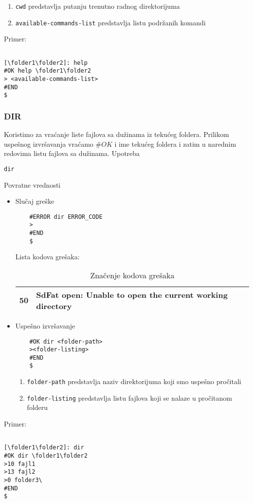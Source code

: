 \documentclass[a4paper]{extarticle}
\begin{document}
\begin{enumerate}
	\item \verb|cwd| predstavlja putanju trenutno radnog direktorijuma
	\item \verb|available-commands-list| predstavlja listu podržanih komandi
\end{enumerate}


Primer:
\begin{verbatim}

[\folder1\folder2]: help
#OK help \folder1\folder2
> <available-commands-list>
#END
$
\end{verbatim}

\subsubsection{DIR}
Koristimo za vraćanje liste fajlova sa dužinama iz tekućeg foldera.
Prilikom uspešnog izvršavanja vraćamo $\#OK$ i ime tekućeg foldera i zatim u narednim redovima listu fajlova sa dužinama.
Upotreba
\begin{verbatim}
dir
\end{verbatim}
Povratne vrednosti
\begin{itemize}
	\item Slučaj greške\\
	\begin{small}
	\begin{verbatim}
	#ERROR dir ERROR_CODE
	>
	#END
	$
	\end{verbatim}
\end{small}
	Lista kodova grešaka:
	\begin{table}[h]
		\centering
		\begin{tabular}{|l|l|}
			\hline
			50 & SdFat open: Unable to open the current working directory \\ \hline
		\end{tabular}
		\caption{Značenje kodova grešaka}
		\label{tab:my-table}
	\end{table}
	\item Uspešno izvršavanje\\
	\begin{verbatim}
	#OK dir <folder-path>
	><folder-listing>
	#END
	$
	\end{verbatim}
	\begin{enumerate}
		\item \verb|folder-path| predstavlja naziv direktorijuma koji smo uspešno pročitali
		\item \verb|folder-listing| predstavlja listu fajlova koji se nalaze u pročitanom folderu
	\end{enumerate}
\end{itemize}
Primer:
\begin{verbatim}

[\folder1\folder2]: dir
#OK dir \folder1\folder2
>10 fajl1
>13 fajl2
>0 folder3\
#END
$
\end{verbatim}
\end{document}
